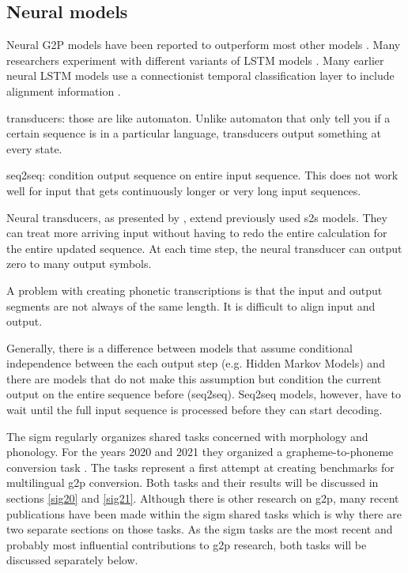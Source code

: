 \subsection{Neural models}
Neural G2P models have been reported to outperform most other models \citep{Lee&Ashby.2020}. Many researchers experiment with different variants of LSTM models \citep{Lee&Ashby.2020, hammond-2021-data, gautam.2021, Rao2015GraphemetophonemeCU}. Many earlier neural LSTM models use a connectionist temporal classification layer to include alignment information \citep{lo-nicolai-2021-linguistic}. 

transducers: those are like automaton. Unlike automaton that only tell you if a certain sequence is in a particular language, transducers output something at every state. 

seq2seq: condition output sequence on entire input sequence. This does not work well for input that gets continuously longer or very long input sequences. 

Neural transducers, as presented by \citet{jaitly2016neural}, extend previously used \ac{s2s} models. They can treat more arriving input without having to redo the entire calculation for the entire updated sequence. At each time step, the neural transducer can output zero to many output symbols. 


A problem with creating phonetic transcriptions is that the input and output segments are not always of the same length. It is difficult to align input and output. 


Generally, there is a difference between models that assume conditional independence between the each output step (e.g. Hidden Markov Models) and there are models that do not make this assumption but condition the current output on the entire sequence before (seq2seq). Seq2seq models, however, have to wait until the full input sequence is processed before they can start decoding. 

The \ac{sigm} \citep{Sigmorphon.2021} regularly organizes shared tasks concerned with morphology and phonology. For the years 2020 and 2021 they organized a grapheme-to-phoneme conversion task \citep{Ashby&Bartley.2021, gorman-etal-2020-sigmorphon}. The tasks represent a first attempt at creating benchmarks for multilingual \ac{g2p} conversion. Both tasks and their results will be discussed in sections \ref{sig20} and \ref{sig21}. Although there is other research on \ac{g2p}, many recent publications have been made within the \ac{sigm} shared tasks which is why there are two separate sections on those tasks. As the \ac{sigm} tasks are the most recent and probably most influential contributions to \ac{g2p} research, both tasks will be discussed separately below. 

